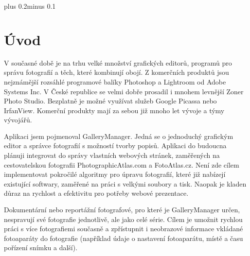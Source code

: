 \documentclass[11pt,twoside,a4paper]{book}
\begin{document}
\mainbodystarts
\normalfont
{}\baselineskip plus 0.2\baselineskip minus 0.1\baselineskip



% 
% 


\chapter{Úvod}

\noindent
V současné době je na trhu velké množství grafických editorů, programů pro správu fotografií a těch, které kombinují obojí. Z komerčních produktů jsou nejznámější rozsáhlé programové balíky Photoshop a Lightroom od Adobe Systems Inc. V České republice se velmi dobře prosadil i mnohem levnější Zoner Photo Studio. Bezplatně je možné využívat služeb Google Picassa nebo IrfanView. Komerční produkty mají za sebou již mnoho let vývoje a týmy vývojářů.

\indent
Aplikaci jsem pojmenoval GalleryManager. Jedná se o jednoduchý grafickým editor a správce fotografií s možností tvorby popisů. Aplikaci do budoucna plánuji integrovat do správy vlastních webových stránek, zaměřených na cestovatelskou fotografii PhotographicAtlas.com a FotoAtlas.cz. Není zde cílem implementovat pokročilé algoritmy pro úpravu fotografií, které již nabízejí existující softwary, zaměřené na práci s velkými soubory a tisk. Naopak je kladen důraz na rychlost a efektivitu pro potřeby webové prezentace.

\indent
Dokumentární nebo reportážní fotografové, pro které je GalleryManager určen, nespravují své fotografie jednotlivě, ale jako celé série. Cílem je umožnit rychlou práci s více fotografiemi současně a zpřístupnit i neobrazové informace vkládané fotoaparáty do fotografie (například údaje o nastavení fotoaparátu, místě a času pořízení snímku a další).
\end{document}

